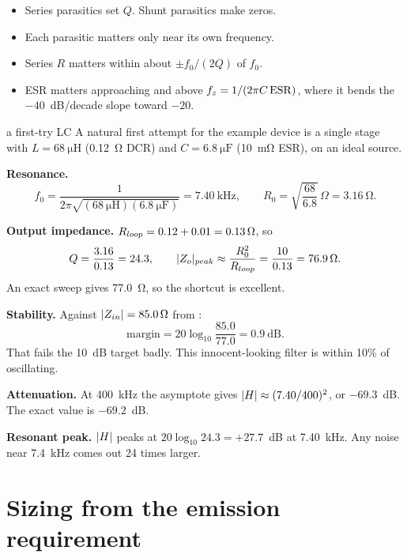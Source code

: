 \begin{itemize}
	\item Series parasitics set $Q$. Shunt parasitics make zeros.
	\item Each parasitic matters only near its own frequency.
	\item Series $R$ matters within about $\pm f_0/(2Q)$ of $f_0$.
	\item ESR matters approaching and above $f_z = 1/(2\pi C\,\mathrm{ESR})$, where it
	      bends the $-40$~dB/decade slope toward $-20$.
\end{itemize}

\begin{examplebox}[label=ex:first-try]{a first-try LC}
	A natural first attempt for the example device is a single stage with
	$L = \qty{68}{\micro\henry}$ (\qty{0.12}{\ohm} DCR) and
	$C = \qty{6.8}{\micro\farad}$ (\qty{10}{\milli\ohm} ESR), on an ideal source.

	\textbf{Resonance.}
	\[
		f_0 = \frac{1}{2\pi\sqrt{(\qty{68}{\micro\henry})(\qty{6.8}{\micro\farad})}} = \qty{7.40}{\kHz},
		\qquad R_0 = \sqrt{\frac{68}{6.8}}\,\Omega = \qty{3.16}{\ohm}.
	\]

	\textbf{Output impedance.} $R_{loop} = 0.12 + 0.01 = \qty{0.13}{\ohm}$, so
	\[
		Q = \frac{3.16}{0.13} = 24.3, \qquad
		\lvert Z_o\rvert_{peak} \approx \frac{R_0^2}{R_{loop}} = \frac{10}{0.13} = \qty{76.9}{\ohm}.
	\]
	An exact sweep gives \qty{77.0}{\ohm}, so the shortcut is excellent.

	\textbf{Stability.} Against $\lvert Z_{in}\rvert = \qty{85.0}{\ohm}$ from :
	\[
		\text{margin} = 20\log_{10}\frac{85.0}{77.0} = 0.9~\text{dB}.
	\]
	That fails the 10~dB target badly. This innocent-looking filter is within
	10\% of oscillating.

	\textbf{Attenuation.} At \qty{400}{\kHz} the asymptote gives
	$\lvert H\rvert \approx (7.40/400)^2$, or $-69.3$~dB. The exact value is $-69.2$~dB.

	\textbf{Resonant peak.} $\lvert H\rvert$ peaks at $20\log_{10} 24.3 = +27.7$~dB at
	\qty{7.40}{\kHz}. Any noise near \qty{7.4}{\kHz} comes out 24 times larger.
\end{examplebox}


\section{Sizing from the emission requirement}
\label{sec:requirement}

